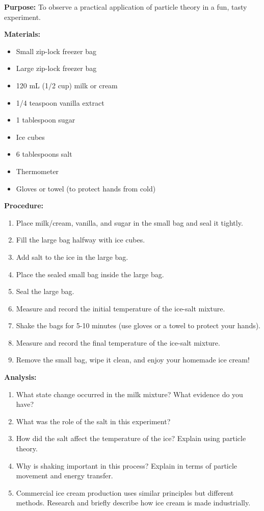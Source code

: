 \documentclass[justified,notoc]{tufte-book}
\newenvironment{investigation}[1]{%
    \begin{tcolorbox}[colback=info!10,colframe=info,title=\textbf{Investigation: #1}]
}{%
    \end{tcolorbox}
}
\begin{document}
\begin{investigation}{Particle Theory in Action: Making Ice Cream}
\textbf{Purpose:} To observe a practical application of particle theory in a fun, tasty experiment.

\textbf{Materials:}
\begin{itemize}
    \item Small zip-lock freezer bag
    \item Large zip-lock freezer bag
    \item 120 mL (1/2 cup) milk or cream
    \item 1/4 teaspoon vanilla extract
    \item 1 tablespoon sugar
    \item Ice cubes
    \item 6 tablespoons salt
    \item Thermometer
    \item Gloves or towel (to protect hands from cold)
\end{itemize}

\textbf{Procedure:}
\begin{enumerate}
    \item Place milk/cream, vanilla, and sugar in the small bag and seal it tightly.
    \item Fill the large bag halfway with ice cubes.
    \item Add salt to the ice in the large bag.
    \item Place the sealed small bag inside the large bag.
    \item Seal the large bag.
    \item Measure and record the initial temperature of the ice-salt mixture.
    \item Shake the bags for 5-10 minutes (use gloves or a towel to protect your hands).
    \item Measure and record the final temperature of the ice-salt mixture.
    \item Remove the small bag, wipe it clean, and enjoy your homemade ice cream!
\end{enumerate}

\textbf{Analysis:}
\begin{enumerate}
    \item What state change occurred in the milk mixture? What evidence do you have?
    \item What was the role of the salt in this experiment?
    \item How did the salt affect the temperature of the ice? Explain using particle theory.
    \item Why is shaking important in this process? Explain in terms of particle movement and energy transfer.
    \item Commercial ice cream production uses similar principles but different methods. Research and briefly describe how ice cream is made industrially.
\end{enumerate}
\end{investigation}
\end{document}
